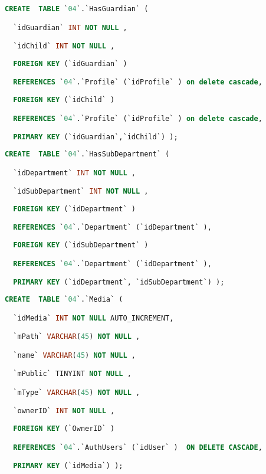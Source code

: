 \begin{lstlisting}[language=SQL,breaklines=true, label=createHasGuardian, caption=Create HasGuardian]
CREATE  TABLE `04`.`HasGuardian` (

  `idGuardian` INT NOT NULL ,

  `idChild` INT NOT NULL ,
  
  FOREIGN KEY (`idGuardian` )

  REFERENCES `04`.`Profile` (`idProfile` ) on delete cascade,
  
  FOREIGN KEY (`idChild` )

  REFERENCES `04`.`Profile` (`idProfile` ) on delete cascade,

  PRIMARY KEY (`idGuardian`,`idChild`) );

\end{lstlisting}

\begin{lstlisting}[language=SQL,breaklines=true, label=createHasSubDepartment, caption=Create HasSubDepartment]
CREATE  TABLE `04`.`HasSubDepartment` (

  `idDepartment` INT NOT NULL ,

  `idSubDepartment` INT NOT NULL ,
  
  FOREIGN KEY (`idDepartment` )

  REFERENCES `04`.`Department` (`idDepartment` ),
  
  FOREIGN KEY (`idSubDepartment` )

  REFERENCES `04`.`Department` (`idDepartment` ),

  PRIMARY KEY (`idDepartment`, `idSubDepartment`) );

\end{lstlisting}

\begin{lstlisting}[language=SQL,breaklines=true, label=createMedia, caption=Create Media]
CREATE  TABLE `04`.`Media` (

  `idMedia` INT NOT NULL AUTO_INCREMENT,

  `mPath` VARCHAR(45) NOT NULL ,

  `name` VARCHAR(45) NOT NULL ,

  `mPublic` TINYINT NOT NULL ,

  `mType` VARCHAR(45) NOT NULL ,

  `ownerID` INT NOT NULL ,
  
  FOREIGN KEY (`OwnerID` )

  REFERENCES `04`.`AuthUsers` (`idUser` )  ON DELETE CASCADE,

  PRIMARY KEY (`idMedia`) );

\end{lstlisting}

